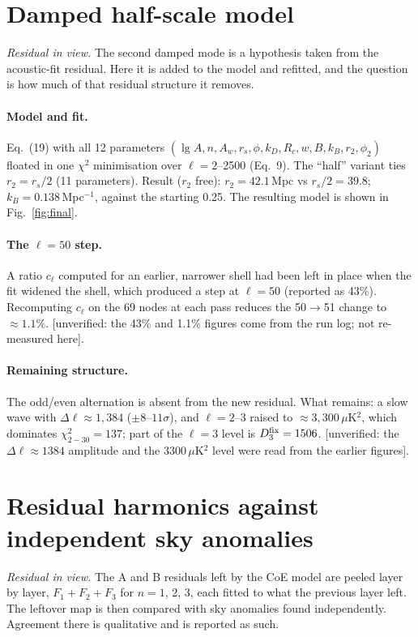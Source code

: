 \documentclass[10pt,twocolumn]{article}
\newcommand{\flag}[1]{\textsf{[unverified: #1]}}
\begin{document}
\section{Damped half-scale model}
\noindent\emph{Residual in view.} The second damped mode is a hypothesis taken from the acoustic-fit residual. Here it is added to the model and refitted, and the question is how much of that residual structure it removes.

\paragraph{Model and fit.} Eq.~(19) with all 12 parameters $(\lg A,n,A_w,r_s,\phi,k_D,R_c,w,B,k_B,r_2,\phi_2)$ floated in one $\chi^2$ minimisation over $\ell=2$--2500 (Eq.~9). The ``half'' variant ties $r_2=r_s/2$ (11 parameters). Result ($r_2$ free): $r_2=42.1$\,Mpc vs $r_s/2=39.8$; $k_B=0.138$\,Mpc$^{-1}$, against the starting 0.25. The resulting model is shown in Fig.~\ref{fig:final}.

\paragraph{The $\ell=50$ step.} A ratio $c_\ell$ computed for an earlier, narrower shell had been left in place when the fit widened the shell, which produced a step at $\ell=50$ (reported as 43\%). Recomputing $c_\ell$ on the 69 nodes at each pass reduces the 50$\to$51 change to $\approx1.1\%$. \flag{the 43\% and 1.1\% figures come from the run log; not re-measured here}.
\paragraph{Remaining structure.} The odd/even alternation is absent from the new residual. What remains: a slow wave with $\Delta\ell\approx1{,}384$ ($\pm8$--$11\sigma$), and $\ell=2$--3 raised to $\approx3{,}300\,\mu$K$^2$, which dominates $\chi^2_{2-30}=137$; part of the $\ell=3$ level is $D^{\rm fix}_3=1506$. \flag{the $\Delta\ell\approx1384$ amplitude and the 3300\,$\mu$K$^2$ level were read from the earlier figures}.

\section{Residual harmonics against independent sky anomalies}\label{sec:skyres}
\noindent\emph{Residual in view.} The A and B residuals left by the CoE model are peeled layer by layer, $F_1+F_2+F_3$ for $n=1$, 2, 3, each fitted to what the previous layer left. The leftover map is then compared with sky anomalies found independently. Agreement there is qualitative and is reported as such.
\end{document}
